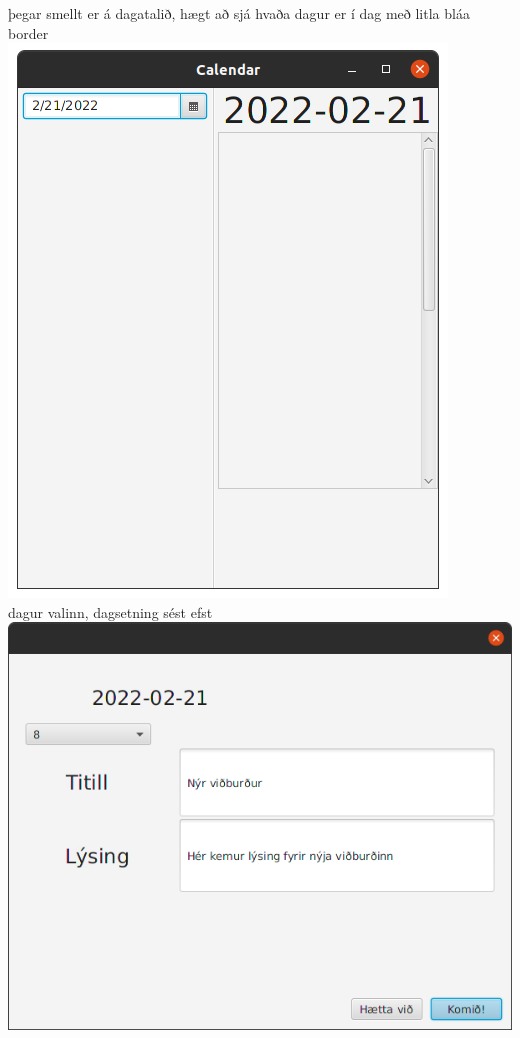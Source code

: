 \documentclass{article}
\begin{document}
\begin{center}
    þegar smellt er á dagatalið, hægt að sjá hvaða dagur er í dag með litla bláa border\\
    \includegraphics[scale=0.3]{imgs/s3.png}\\
    dagur valinn, dagsetning sést efst\\
    \includegraphics[scale=0.3]{imgs/s4.png}\\

\end{center}
\end{document}
